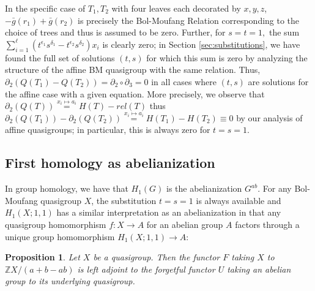 \documentclass[11pt]{amsart}
\newtheorem{proposition}[theorem]{Proposition}
\theoremstyle{definition}
\newcommand{\Z}{\mathbb{Z}}
\begin{document}
In the specific case of $T_1,T_2$ 
with four leaves each decorated by $x,y,z$, $-\bar g (r_1) + \bar g (r_2)$ is precisely the Bol-Moufang Relation corresponding to the choice of trees and thus is assumed to be zero. Further, for $s=t=1,$ the sum $\sum_{i = 1}^{\ell} (t^{\epsilon_1} s^{\delta_1} - t^{\epsilon_2} s^{\delta_2}) x_i$ is clearly zero; in Section \ref{sec:substitutions}, we have found the full set of solutions $(t,s)$ for which this sum is zero by analyzing the structure of the affine BM quasigroup with the same relation.  Thus, $\partial_2(Q(T_1) - Q(T_2)) = \partial_2 \circ \partial_3 = 0$ in all cases where $(t,s)$ are solutions for the affine case with a given 
equation.  More precisely, we observe that $\partial_2(Q(T))\stackrel{x_i\mapsto a_i}{=}H(T)-rel(T)$ thus $\partial_2(Q(T_1)) - \partial_2(Q(T_2))\stackrel{x_i \mapsto a_i}{=} H(T_1)-H(T_2)\equiv 0$ by our analysis of affine quasigroups; in particular, this is always zero for $t=s=1$.

\subsection{First homology as abelianization}\label{S:H1Ab}


In group homology, we have that $H_1(G)$ is the abelianization $G^{ab}$. For any Bol-Moufang quasigroup $X$, the substitution $t = s = 1$ is always available and $H_1(X;1,1)$ has a similar interpretation as an abelianization in that any quasigroup homomorphism $f: X \to A$ for an abelian group $A$ factors through a unique group homomorphism $H_1(X;1,1) \to A$:

\begin{proposition}
    Let $X$ be a quasigroup. Then the functor $F$ taking $X$ to $\Z X/(a + b - ab)$ is left adjoint to the forgetful functor $U$ taking an abelian group to its underlying quasigroup. 
\end{proposition}
\end{document}
